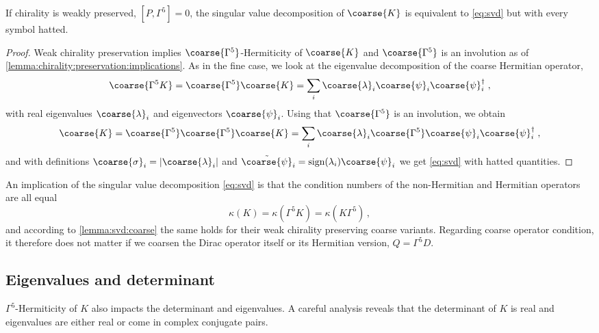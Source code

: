 \begin{lemma} \label{lemma:svd:coarse}
If chirality is weakly preserved, $[P, \Gamma^5]=0$, the singular value decomposition of $\coarse{K}$ is equivalent to \cref{eq:svd} but with every symbol hatted.
\end{lemma}

\begin{proof}
Weak chirality preservation implies $\coarse{\Gamma^{5}}$-Hermiticity of $\coarse{K}$ and $\coarse{\Gamma^{5}}$ is an involution as of \cref{lemma:chirality:preservation:implications}.
As in the fine case, we look at the eigenvalue decomposition of the coarse Hermitian operator,
\begin{equation}
\coarse{\Gamma^{5} K} = \coarse{\Gamma^{5}} \coarse{K} = \sum_{i} \coarse{\lambda}_i \coarse{\psi}_i \coarse{\psi}_i^{\dagger} \;,
\end{equation}
with real eigenvalues $\coarse{\lambda}_i$ and eigenvectors $\coarse{\psi}_i$. Using that $\coarse{\Gamma^{5}}$ is an involution, we obtain
\begin{equation}
\coarse{K} = \coarse{\Gamma^{5}} \coarse{\Gamma^{5}} \coarse{K} = \sum_{i} \coarse{\lambda}_i \coarse{\Gamma^{5}} \coarse{\psi}_i \coarse{\psi}_i^{\dagger} \;,
\end{equation}
and with definitions $\coarse{\sigma}_i = \lvert \coarse{\lambda}_i \rvert$ and $\tilde{\coarse{\psi}}_i = \text{sign}(\lambda_i) \coarse{\psi}_i$ we get \cref{eq:svd} with hatted quantities.
\end{proof}

An implication of the singular value decomposition \cref{eq:svd} is that the condition numbers of the non-Hermitian and Hermitian operators are all equal
\begin{equation} \label{eq:cond:K:g5K:equal}
\kappa(K) = \kappa(\Gamma^{5} K) = \kappa(K \Gamma^{5}) \,,
\end{equation}
and according to \cref{lemma:svd:coarse} the same holds for their weak chirality preserving coarse variants.
Regarding coarse operator condition, it therefore does not matter if we coarsen the Dirac operator itself or its Hermitian version, $Q=\Gamma^{5} D$.

\subsection{Eigenvalues and determinant}

$\Gamma^{5}$-Hermiticity of $K$ also impacts the determinant and eigenvalues.
A careful analysis reveals that the determinant of $K$ is real and eigenvalues are either real or come in complex conjugate pairs.

